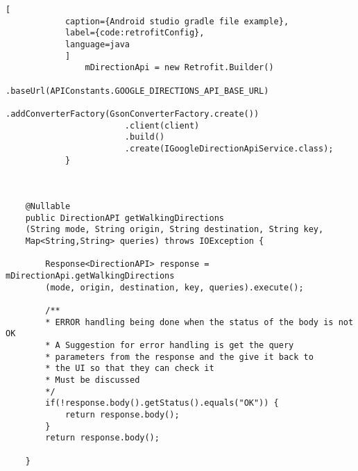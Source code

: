 \begin{lstlisting}[
            caption={Android studio gradle file example},
            label={code:retrofitConfig},
            language=java
            ]
                mDirectionApi = new Retrofit.Builder()
                        .baseUrl(APIConstants.GOOGLE_DIRECTIONS_API_BASE_URL)
                        .addConverterFactory(GsonConverterFactory.create())
                        .client(client)
                        .build()
                        .create(IGoogleDirectionApiService.class);
            }


            
    @Nullable
    public DirectionAPI getWalkingDirections
    (String mode, String origin, String destination, String key, 
    Map<String,String> queries) throws IOException {
       
        Response<DirectionAPI> response = mDirectionApi.getWalkingDirections
        (mode, origin, destination, key, queries).execute();

        /**
        * ERROR handling being done when the status of the body is not OK
        * A Suggestion for error handling is get the query 
        * parameters from the response and the give it back to 
        * the UI so that they can check it
        * Must be discussed
        */
        if(!response.body().getStatus().equals("OK")) {
            return response.body();
        }
        return response.body();
        
    }

        \end{lstlisting}